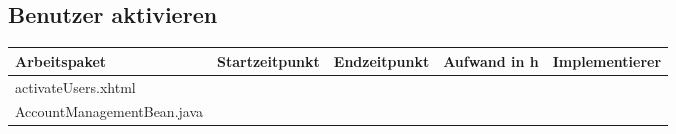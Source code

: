\begin{landscape}
	\subsection{Benutzer aktivieren}
	\begin{tabular}{|p{10cm}|p{4cm}|p{3cm}|p{3cm}|p{3cm}|}
		\hline  \textbf{Arbeitspaket} & \textbf{Startzeitpunkt} & \textbf{Endzeitpunkt} & \textbf{Aufwand in h} & \textbf{Implementierer} \\ 
		\hline   activateUsers.xhtml                                 &                            &                             &                     &\\
		\hline   AccountManagementBean.java                              &                            &                             &                     &\\
		\hline 
	\end{tabular} \ \\
	\ \\
	

\end{landscape}
